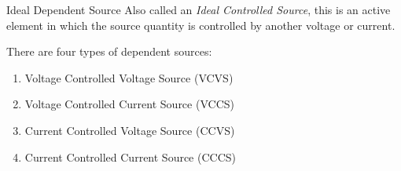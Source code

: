 \documentclass[12pt]{article}
\begin{document}
\begin{definition}{Ideal Dependent Source}
  Also called an \textit{Ideal Controlled Source}, this is an active element in which the source quantity is controlled by another voltage or current.
\end{definition}


There are four types of dependent sources:
\begin{enumerate}
  \itemsep0em
  \item Voltage Controlled Voltage Source (VCVS)
  \item Voltage Controlled Current Source (VCCS)
  \item Current Controlled Voltage Source (CCVS)
  \item Current Controlled Current Source (CCCS)
\end{enumerate}
\end{document}
